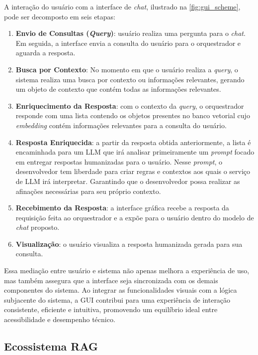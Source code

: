 \documentclass[a4paper, 12pt]{article}
\begin{document}
    A interação do usuário com a interface de \textit{chat}, ilustrado na \autoref{fig:gui_scheme}, pode ser decomposto em seis etapas:
    
    \begin{enumerate}
        \item \textbf{Envio de Consultas (\textit{Query})}: usuário realiza uma pergunta para o \textit{chat}. Em seguida, a interface envia a consulta do usuário para o orquestrador e aguarda a resposta.
        \item \textbf{Busca por Contexto}: No momento em que o usuário realiza a \textit{query}, o sistema realiza uma busca por contexto ou informações relevantes, gerando um objeto de contexto que contém todas as informações relevantes.
        \item \textbf{Enriquecimento da Resposta}: com o contexto da \textit{query}, o orquestrador responde com uma lista contendo os objetos presentes no banco vetorial cujo \textit{embedding} contém informações relevantes para a consulta do usuário.
        \item \textbf{Resposta Enriquecida}: a partir da resposta obtida anteriormente, a lista é encaminhada para um LLM que irá analisar primeiramente um \textit{prompt} focado em entregar respostas humanizadas para o usuário. Nesse \textit{prompt}, o desenvolvedor tem liberdade para criar regras e contextos aos quais o serviço de LLM irá interpretar. Garantindo que o desenvolvedor possa realizar as afinações necessárias para seu próprio contexto.
        \item \textbf{Recebimento da Resposta}: a interface gráfica recebe a resposta da requisição feita ao orquestrador e a expõe para o usuário dentro do modelo de \textit{chat} proposto.
        \item \textbf{Visualização}: o usuário visualiza a resposta humanizada gerada para sua consulta.
    \end{enumerate}

    Essa mediação entre usuário e sistema não apenas melhora a experiência de uso, mas também assegura que a interface seja sincronizada com os demais componentes do sistema. Ao integrar as funcionalidades visuais com a lógica subjacente do sistema, a GUI contribui para uma experiência de interação consistente, eficiente e intuitiva, promovendo um equilíbrio ideal entre acessibilidade e desempenho técnico.
    
    \subsection{Ecossistema RAG} \label{sec:ecosystem}
    
\end{document}
